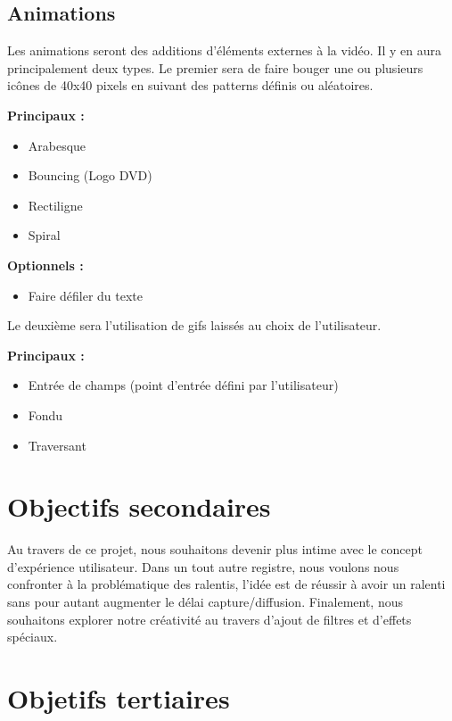 \subsection{Animations}

Les animations seront des additions d'éléments externes à la vidéo. Il y en aura principalement deux types. Le premier sera de faire bouger une ou plusieurs icônes de 40x40 pixels en suivant des patterns définis ou aléatoires.

\textbf{ Principaux : }

\begin{itemize}
  \item Arabesque
  \item Bouncing (Logo DVD)
  \item Rectiligne
  \item Spiral
\end{itemize}

\textbf{ Optionnels : }

\begin{itemize}
  \item Faire défiler du texte
\end{itemize}

Le deuxième sera l'utilisation de gifs laissés au choix de l'utilisateur.

\textbf{ Principaux : }

\begin{itemize}
  \item Entrée de champs (point d'entrée défini par l'utilisateur)
  \item Fondu
  \item Traversant
\end{itemize} 

\section{Objectifs secondaires}

Au travers de ce projet, nous souhaitons devenir plus intime avec le concept d'expérience utilisateur.
Dans un tout autre registre, nous voulons nous confronter à la problématique des ralentis, l'idée est de réussir à avoir un ralenti sans pour autant augmenter le délai capture/diffusion.
Finalement, nous souhaitons explorer notre créativité au travers d'ajout de filtres et d'effets spéciaux.

\section{Objetifs tertiaires}

